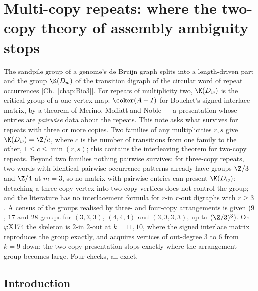 \chapter{Multi-copy repeats: where the two-copy theory of assembly ambiguity stops}\label{chap:Bio4}
\begin{chapterabstract}
\noindent
The sandpile group of a genome's de Bruijn graph splits into a length-driven part and
the group $\K(D_w)$ of the transition digraph of the circular word of repeat occurrences
[Ch.~\ref{chap:Bio3}]. For repeats of multiplicity two, $\K(D_w)$ is the critical group of a
one-vertex map: $\coker(A+I)$ for Bouchet's signed interlace matrix, by a theorem of
Merino, Moffatt and Noble --- a presentation whose entries are \emph{pairwise} data
about the repeats. This note asks what survives for repeats with three or more copies.
Two families of any multiplicities $r,s$ give $\K(D_w)=\Z/c$, where $c$ is the number of
transitions from one family to the other, $1\le c\le\min(r,s)$; this contains the
interleaving theorem for two-copy repeats. Beyond two families nothing pairwise survives:
for three-copy repeats, two words with identical pairwise occurrence patterns already
have groups $\Z/3$ and $\Z/4$ at $m=3$, so no matrix with pairwise entries can present
$\K(D_w)$; detaching a three-copy vertex into two-copy vertices does not control the
group; and the literature has no interlacement formula for $r$-in $r$-out digraphs with
$r\ge3$. A census of the groups realised by three- and four-copy arrangements is given
($9$, $17$ and $28$ groups for $(3,3,3)$, $(4,4,4)$ and $(3,3,3,3)$, up to $(\Z/3)^{3}$).
On $\varphi$X174 the skeleton is $2$-in $2$-out at $k=11,10$, where the signed interlace
matrix reproduces the group exactly, and acquires vertices of out-degree $3$ to $6$ from
$k=9$ down: the two-copy presentation stops exactly where the arrangement group becomes
large. Four checks, all exact.
\end{chapterabstract}

\section{Introduction}\label{Bio4:sec:intro}

